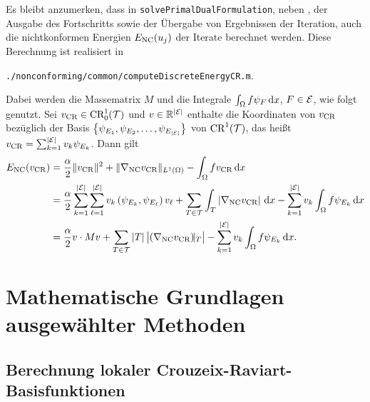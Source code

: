 Es bleibt anzumerken, dass in \texttt{solvePrimalDualFormulation}, neben 
, der Ausgabe des Fortschritts sowie
der Übergabe von Ergebnissen der Iteration, auch die
nichtkonformen Energien $E_\textup{NC}(u_j)$ der Iterate berechnet werden. 
Diese Berechnung ist realisiert in
\begin{center}
  \texttt{./nonconforming/common/computeDiscreteEnergyCR.m}.
\end{center}
Dabei werden die Massematrix $M$ und die Integrale 
$\int_\Omega f\psi_{F}\,\mathrm{d}x$, $F\in\mathcal{E}$, wie folgt genutzt.
Sei $v_\textup{CR}\in\textup{CR}^1_0(\mathcal{T})$ und $v\in\mathbb{R}^{|\mathcal{E}|}$
enthalte die Koordinaten von $v_\textup{CR}$ bezüglich der Basis
$\left\{\psi_{E_1},\psi_{E_2},\ldots,\psi_{E_{|\mathcal{E}|}}\right\}$
von $\textup{CR}^1(\mathcal{T})$, das heißt
$v_\textup{CR}=\sum_{k=1}^{|\mathcal{E}|}v_k \psi_{E_k}$.
Dann gilt
\begin{align*}
  E_\textup{NC}(v_\textup{CR})
  &=
  \frac{\alpha}{2}\Vert v_\textup{CR}\Vert^2
  + \Vert\nabla_\textup{NC} v_\textup{CR}\Vert_{L^1(\Omega)}
  -\int_\Omega fv_\textup{CR}\,\mathrm{d}x\\
  &=
  \frac{\alpha}{2}
  \sum_{k=1}^{|\mathcal{E}|} 
  \sum_{\ell=1}^{|\mathcal{E}|} 
  v_k\left( \psi_{E_k}, \psi_{E_\ell} \right)v_\ell
  + \sum_{T\in\mathcal{T}}
   \int_T\left|\nabla_\textup{NC} v_\textup{CR}\right|\,\mathrm{d}x
  -\sum_{k=1}^{|\mathcal{E}|}v_k\int_\Omega f\psi_{E_k}\,\mathrm{d}x\\
  &=
  \frac{\alpha}{2} v\cdot Mv
  + \sum_{T\in\mathcal{T}}|T|\, \big|\!\left(\nabla_\textup{NC} v_\textup{CR}\right)\!\!|_T\big|
  -\sum_{k=1}^{|\mathcal{E}|}v_k\int_\Omega f\psi_{E_k}\,\mathrm{d}x.
\end{align*}


\section{Mathematische Grundlagen ausgewählter Methoden}
\label{sec:mathematicalBasicsForMethods}


\subsection{Berechnung lokaler Crouzeix-Raviart-Basisfunktionen}
\label{sec:localCRBasisRealization}

